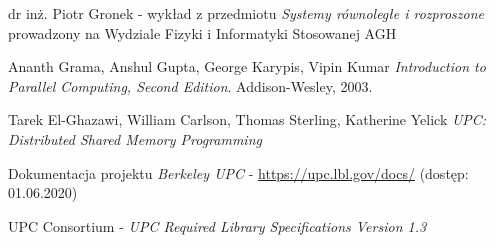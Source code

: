 \documentclass[12pt]{article}
\begin{document}
\begin{thebibliography}{9}

dr inż. Piotr Gronek - wykład z przedmiotu \textit{Systemy równoległe i rozproszone} prowadzony na Wydziale Fizyki i Informatyki Stosowanej AGH

Ananth Grama, Anshul Gupta, George Karypis, Vipin Kumar 
\textit{Introduction to Parallel Computing, Second Edition}. 
Addison-Wesley, 2003.

Tarek El-Ghazawi, William Carlson, Thomas Sterling, Katherine Yelick 
\textit{UPC: Distributed Shared Memory Programming}

Dokumentacja projektu \textit{Berkeley UPC} - \url{https://upc.lbl.gov/docs/} (dostęp: 01.06.2020)

UPC Consortium - \textit{UPC Required Library Specifications Version 1.3}



\end{thebibliography}
\end{document}

